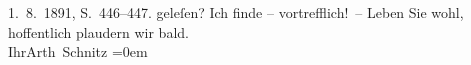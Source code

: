 \begin{ledgroupsized}[t]{13cm}
{{{                        1. 8. 1891, S. 446–447.}}}\label{K_L00028_3h} geleſen? Ich finde –
               vortrefflich! –\pend
           \pstart
           Leben Sie wohl, hoffentlich plaudern wir bald.{\\[\baselineskip]}Ihr\spacefill\mbox{Arth
                  Schnitz}\pend
           \leftskip=0em{}\endnumbering{}\end{ledgroupsized}  \newcommand{\dateiname}{L00028}\newcommand{\titel}{Arthur Schnitzler an Hugo von Hofmannsthal, 11. 8. 1891}\newcommand{\editorInnen}{ Martin Anton Müller und Gerd-Hermann Susen}
      
